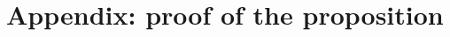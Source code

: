 \documentclass[11pt]{article}
\newcommand{\V}{\mathbf{V}}
\begin{document}




\clearpage




\section*{Appendix: proof of the proposition}
\end{document}
